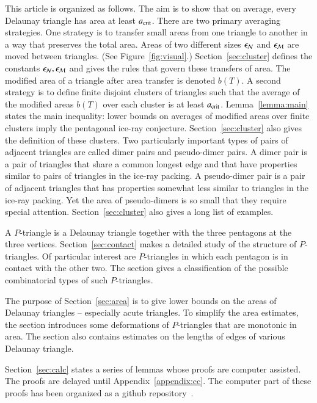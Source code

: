 This article is organized as follows.  The aim is to show that on
average, every Delaunay triangle has area at least $a_\text{crit}$.  There
are two primary averaging strategies.  One strategy is to transfer
small areas from one triangle to another in a way that preserves the
total area.  Areas of two different sizes $\epsilon_{\mathcal N}$ and $\epsilon_{\mathcal M}$ are
moved between triangles. (See Figure~\ref{fig:visual}.)  Section~\ref{sec:cluster}
defines the constants $\epsilon_{\mathcal N},\epsilon_{\mathcal M}$ and gives the rules that govern
these transfers of area.  The modified area of a triangle after area
transfer is denoted $b(T)$.  A second strategy is to define finite
disjoint clusters of triangles such that the average of the modified
areas $b(T)$ over each cluster is at least $a_\text{crit}$.  Lemma~\ref{lemma:main}
states the main inequality:
lower bounds on averages of modified areas over finite
clusters imply the pentagonal ice-ray conjecture.
Section~\ref{sec:cluster} also gives the definition of these clusters.
Two particularly important types of pairs of adjacent triangles are
called dimer pairs and pseudo-dimer pairs.  A dimer pair is a pair of
triangles that share a common longest edge and that have properties
similar to pairs of triangles in the ice-ray packing.
A pseudo-dimer pair is a pair of adjacent triangles that has properties
somewhat less similar to triangles in the ice-ray packing.  Yet the area
of pseudo-dimers is so small that they require special attention.
Section~\ref{sec:cluster} also gives a long list of examples.

A $P$-triangle is a Delaunay triangle together with the three pentagons
at the three vertices. Section~\ref{sec:contact} makes a detailed
study of the structure of $P$-triangles.  Of particular interest are
$P$-triangles in which each pentagon is in contact with the other two.
The section gives a classification of the possible combinatorial types
of such $P$-triangles.

The purpose of Section~\ref{sec:area} is to give lower bounds
on the areas of Delaunay triangles -- especially acute triangles.
To simplify the area estimates, 
the section introduces some deformations of $P$-triangles that
are monotonic in area.  The section also contains estimates on
the lengths of edges of various Delaunay triangle.

Section~\ref{sec:calc} states a series of lemmas whose proofs are
computer assisted.  The proofs are delayed until 
Appendix~\ref{appendix:cc}.  The computer part of these proofs has
been organized as a github repository~\cite{Git}.

